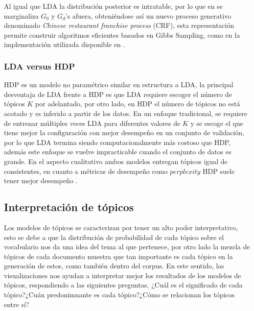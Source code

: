 \documentclass[letterpaper,12pt,oneside]{book} %
\begin{document}
Al igual que LDA la distribución posterior es intratable, por lo que en \citep{teh2005sharing} se marginaliza $G_{0}$ y $G_{d}$'s afuera, obteniéndose así un nuevo proceso generativo denominado \textit{Chinese restaurant franchise process} (CRF), esta representación permite construir algoritmos eficientes basados en Gibbs Sampling, como en la implementación utilizada disponible en \citep{HDP}.

\subsubsection{LDA versus HDP}
HDP es un modelo no paramétrico similar en estructura a LDA, la principal desventaja de LDA frente a HDP es que LDA requiere escoger el número de tópicos $K$ por adelantado, por otro lado, en HDP el número de tópicos no está acotado y es inferido a partir de los datos. En un enfoque tradicional, se requiere de entrenar múltiples veces LDA para diferentes valores de $K$ y se escoge el que tiene mejor la configuración con mejor desempeño en un conjunto de validación, por lo que LDA termina siendo computacionalmente más costoso que HDP, además este enfoque se vuelve impracticable cuando el conjunto de datos es grande. En el aspecto cualitativo ambos modelos entregan tópicos igual de consistentes, en cuanto a métricas de desempeño como $\textit{perplexity}$ HDP suele tener mejor desempeño \citep{teh2005sharing}.

\subsection{Interpretación de tópicos}
Los modelos de tópicos se caracterizan por tener un alto poder interpretativo, esto se debe a que la distribución de probabilidad de cada tópico sobre el vocabulario nos da una idea del tema al que pertenece, por otro lado la mezcla de tópicos de cada documento muestra que tan importante es cada tópico en la generación de estos, como también dentro del corpus. En este sentido, las visualizaciones nos ayudan a interpretar mejor los resultados de los modelos de tópicos, respondiendo a las siguientes preguntas, ¿Cuál es el significado de cada tópico?¿Cuán predonimnante es cada tópico?¿Cómo se relacionan los tópicos entre sí?\\
\end{document}
